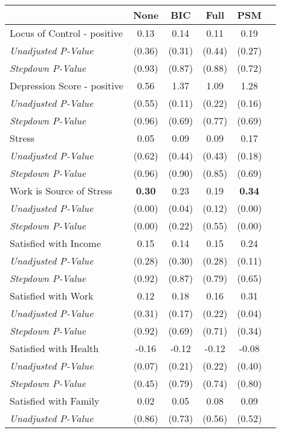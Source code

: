 \begin{tabular}{l c c c c c}
\toprule
 & None & BIC & Full & PSM \\
\midrule
Locus of Control - positive & 0.13 & 0.14 & 0.11 & 0.19 \\
\quad \textit{Unadjusted P-Value} & (0.36) & (0.31) & (0.44) & (0.27) \\
\quad \textit{Stepdown P-Value} & (0.93) & (0.87) & (0.88) & (0.72) \\
Depression Score - positive & 0.56 & 1.37 & 1.09 & 1.28 \\
\quad \textit{Unadjusted P-Value} & (0.55) & (0.11) & (0.22) & (0.16) \\
\quad \textit{Stepdown P-Value} & (0.96) & (0.69) & (0.77) & (0.69) \\
Stress & 0.05 & 0.09 & 0.09 & 0.17 \\
\quad \textit{Unadjusted P-Value} & (0.62) & (0.44) & (0.43) & (0.18) \\
\quad \textit{Stepdown P-Value} & (0.96) & (0.90) & (0.85) & (0.69) \\
Work is Source of Stress & \textbf{ 0.30 } & 0.23 & 0.19 & \textbf{ 0.34 } \\
\quad \textit{Unadjusted P-Value} & (0.00) & (0.04) & (0.12) & (0.00) \\
\quad \textit{Stepdown P-Value} & (0.00) & (0.22) & (0.55) & (0.00) \\
Satisfied with Income & 0.15 & 0.14 & 0.15 & 0.24 \\
\quad \textit{Unadjusted P-Value} & (0.28) & (0.30) & (0.28) & (0.11) \\
\quad \textit{Stepdown P-Value} & (0.92) & (0.87) & (0.79) & (0.65) \\
Satisfied with Work & 0.12 & 0.18 & 0.16 & 0.31 \\
\quad \textit{Unadjusted P-Value} & (0.31) & (0.17) & (0.22) & (0.04) \\
\quad \textit{Stepdown P-Value} & (0.92) & (0.69) & (0.71) & (0.34) \\
Satisfied with Health & -0.16 & -0.12 & -0.12 & -0.08 \\
\quad \textit{Unadjusted P-Value} & (0.07) & (0.21) & (0.22) & (0.40) \\
\quad \textit{Stepdown P-Value} & (0.45) & (0.79) & (0.74) & (0.80) \\
Satisfied with Family & 0.02 & 0.05 & 0.08 & 0.09 \\
\quad \textit{Unadjusted P-Value} & (0.86) & (0.73) & (0.56) & (0.52) \\

\end{tabular}
